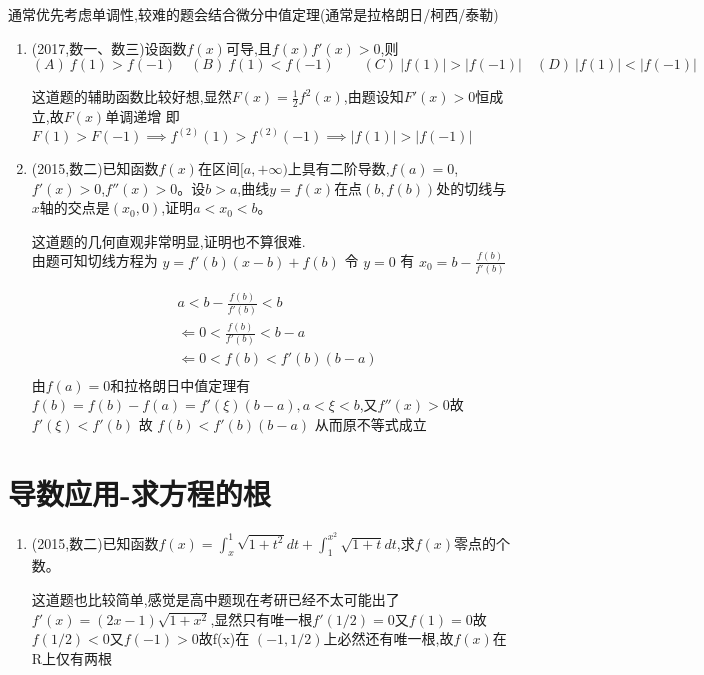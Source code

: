 \documentclass[12pt, a4paper, oneside, UTF8]{ctexbook}
\begin{document}
\begin{remark}
    通常优先考虑单调性,较难的题会结合微分中值定理(通常是拉格朗日/柯西/泰勒) 
\end{remark}
\begin{enumerate}[label=\arabic*.,start=21]
    \item  (2017,数一、数三)设函数$f(x)$可导,且$f(x)f'(x)>0$,则 \\
        $(A)\ f(1)>f(-1) \quad (B)\ f(1)<f(-1) \qquad
        (C)\ |f(1)| >|f(-1)| \quad (D)\ |f(1)|<|f(-1)| $
    
    \begin{solution}
    这道题的辅助函数比较好想,显然$F(x)=\frac{1}{2}f^{2}(x)$,由题设知$F'(x)>0$恒成立,故$F(x)$单调递增
    即$F(1)>F(-1)\implies f^(2)(1)>f^(2)(-1)\implies \left|f(1)\right|>\left|f(-1)\right|$
    \end{solution}
    
    \item  (2015,数二)已知函数$f(x)$在区间$[a,+\infty)$上具有二阶导数,$f(a)=0$,$f'(x)>0$,$f''(x)>0$。设$b>a$,曲线$y=f(x)$在点$(b,f(b))$处的切线与$x$轴的交点是$(x_0,0)$,证明$a<x_0<b$。
    
    \begin{solution}
    这道题的几何直观非常明显,证明也不算很难. \\
    由题可知切线方程为 $y=f'(b)(x-b)+f(b)$ 令 $y=0$ 有 $x_0=b-\frac{f(b)}{f'(b)}$ 

    \begin{align*}
        & a < b - \frac{f(b)}{f'(b)} < b \\
        & \Leftarrow 0 < \frac{f(b)}{f'(b)} < b - a \\
        & \Leftarrow 0 < f(b) < f'(b)(b - a) \\
    \end{align*}
    由$f(a)=0$和拉格朗日中值定理有 $f(b) = f(b)-f(a) = f'(\xi)(b-a), a < \xi < b$,又$f''(x)>0$故
    $f'(\xi)<f'(b)$ 故 $f(b) < f'(b)(b-a)$ 从而原不等式成立
    \end{solution}
\end{enumerate}

\section{导数应用-求方程的根}

\begin{enumerate}[label=\arabic*.,start=23]

    \item  (2015,数二)已知函数$f(x)=\int_x^1\sqrt{1+t^2}dt+\int_1^{x^2}\sqrt{1+t}dt$,求$f(x)$零点的个数。
    
    \begin{solution}
    这道题也比较简单,感觉是高中题现在考研已经不太可能出了 \\
    $f'(x)=(2x-1)\sqrt{1+x^2}$,显然只有唯一根$f'(1/2)=0$又$f(1)=0$故$f(1/2)<0$又$f(-1)>0$故f(x)在
    $(-1,1/2)$上必然还有唯一根,故$f(x)$在R上仅有两根
    \end{solution}
\end{enumerate}
\end{document}
